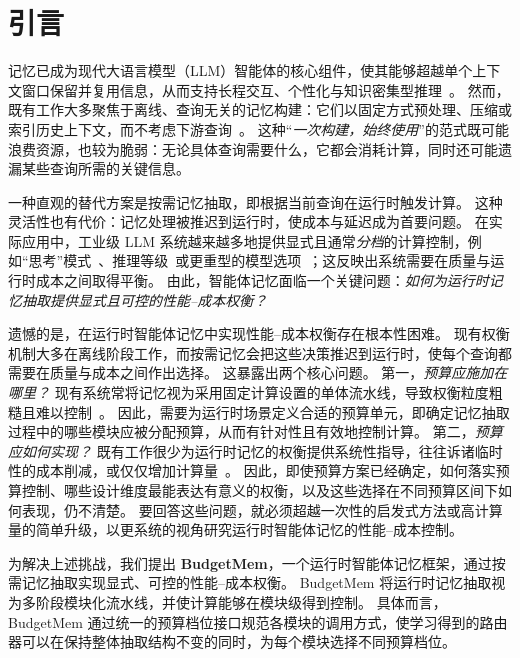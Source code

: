 \section{引言}
\label{sec:intro}

记忆已成为现代大语言模型（LLM）智能体的核心组件，使其能够超越单个上下文窗口保留并复用信息，从而支持长程交互、个性化与知识密集型推理~\citep{hu2025memory}。
然而，既有工作大多聚焦于离线、查询无关的记忆构建：它们以固定方式预处理、压缩或索引历史上下文，而不考虑下游查询~\citep{kang2025memory, fang2025lightmem, zhong2024memorybank, xu2025mem, packer2023memgpt, chhikara2025mem0}。
这种“\textit{一次构建，始终使用}”的范式既可能浪费资源，也较为脆弱：无论具体查询需要什么，它都会消耗计算，同时还可能遗漏某些查询所需的关键信息。

一种直观的替代方案是按需记忆抽取，即根据当前查询在运行时触发计算。
这种灵活性也有代价：记忆处理被推迟到运行时，使成本与延迟成为首要问题。
在实际应用中，工业级 LLM 系统越来越多地提供显式且通常\textit{分档}的计算控制，例如“思考”模式~\citep{singh2025openai}、推理等级~\citep{openai-codex}或更重型的模型选项~\citep{claude-code}；这反映出系统需要在质量与运行时成本之间取得平衡。
由此，智能体记忆面临一个关键问题：\textit{如何为运行时记忆抽取提供显式且可控的性能--成本权衡？}

遗憾的是，在运行时智能体记忆中实现性能--成本权衡存在根本性困难。
现有权衡机制大多在离线阶段工作，而按需记忆会把这些决策推迟到运行时，使每个查询都需要在质量与成本之间作出选择。
这暴露出两个核心问题。
第一，\textit{预算应施加在哪里？}
现有系统常将记忆视为采用固定计算设置的单体流水线，导致权衡粒度粗糙且难以控制~\citep{kang2025memory, zhong2024memorybank}。
因此，需要为运行时场景定义合适的预算单元，即确定记忆抽取过程中的哪些模块应被分配预算，从而有针对性且有效地控制计算。
第二，\textit{预算应如何实现？}
既有工作很少为运行时记忆的权衡提供系统性指导，往往诉诸临时性的成本削减，或仅仅增加计算量~\citep{yan2025general}。
因此，即使预算方案已经确定，如何落实预算控制、哪些设计维度最能表达有意义的权衡，以及这些选择在不同预算区间下如何表现，仍不清楚。
要回答这些问题，就必须超越一次性的启发式方法或高计算量的简单升级，以更系统的视角研究运行时智能体记忆的性能--成本控制。

为解决上述挑战，我们提出 \textbf{BudgetMem}，一个运行时智能体记忆框架，通过按需记忆抽取实现显式、可控的性能--成本权衡。
BudgetMem 将运行时记忆抽取视为多阶段模块化流水线，并使计算能够在模块级得到控制。
具体而言，BudgetMem 通过统一的预算档位接口规范各模块的调用方式，使学习得到的路由器可以在保持整体抽取结构不变的同时，为每个模块选择不同预算档位。

